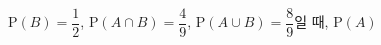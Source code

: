 $\mathrm{P}(B)=\dfrac{1}{2}$, $\mathrm{P}(A\cap B)=\dfrac{4}{9}$, $\mathrm{P}(A\cup B)=\dfrac{8}{9}$일 때, $\mathrm{P}(A)$
